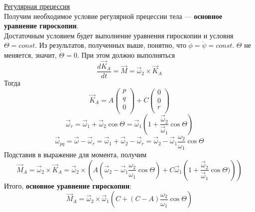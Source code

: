\underline{Регулярная прецессия}\\
Получим необходимое условие регулярной прецессии тела --- \textbf{основное уравнение гироскопии}.\\

Достаточным условием будет выполнение уравнения гироскопии и условия $\Theta = const$. Из результатов, полученных выше, понятно, что $\dot{\phi} = \dot{\psi} = const$. $\Theta$ не меняется, значит, $\dot{\Theta} = 0$. При этом должно выполняться
\[
\dfrac{d \vec{K}_A}{d t} = \vec{M} = \vec{\omega}_2 \times \vec{K}_A
\]
Тогда
\[
\vec{K}_A = A\begin{pmatrix}
    p\\
    q\\
    0\\
\end{pmatrix} + C\begin{pmatrix}
    0\\
    0\\
    r\\
\end{pmatrix}
\]
\[
\vec{\omega}_r = \vec{\omega}_1 + \vec{\omega}_2\cos{\Theta} = \vec{\omega}_1\left(1 + \dfrac{\vec{\omega}_2}{\vec{\omega}_1}\cos{\Theta}\right)
\]
\[
\vec{\omega}_{pq} = \vec{\omega} - \vec{\omega}_r = \vec{\omega}_1 + \vec{\omega}_2 - \vec{\omega}_r = \vec{\omega}_2 - \vec{\omega}_1\dfrac{{\omega}_2}{\omega_1}\cos{\Theta}
\]
Подставив в выражение для момента, получим
\[
\vec{M}_A = \vec{\omega}_2 \times \vec{K}_A = \vec{\omega}_2 \times \left( A\left(\vec{\omega}_2 - \vec{\omega}_1\dfrac{{\omega}_2}{\omega_1}\cos{\Theta}\right) + C\vec{\omega}_1\left(1 + \dfrac{\vec{\omega}_2}{\vec{\omega}_1}\cos{\Theta})\right)\right)
\]
Итого, \textbf{основное уравнение гироскопии}:
\[
\vec{M}_A = \vec{\omega}_2 \times \vec{\omega}_1\left(C + (C - A)\dfrac{{\omega}_2}{\omega_1}\cos{\Theta}\right)
\]



